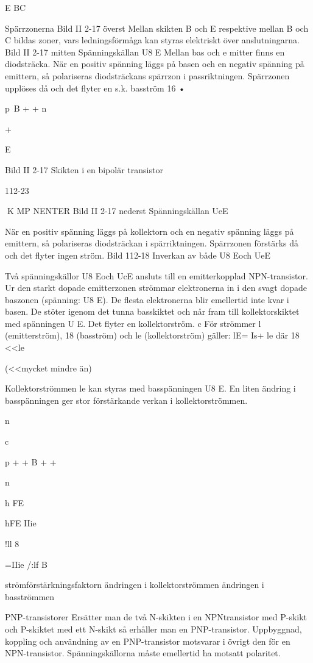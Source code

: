 {E BC

Spärrzonerna
Bild II 2-17 överst
Mellan skikten B och E respektive mellan B
och C bildas zoner, vars ledningsförmåga
kan styras elektriskt över anslutningarna.
Bild II 2-17 mitten
Spänningskällan U8 E
Mellan bas och e mitter finns en diodsträcka.
När en positiv spänning läggs på basen och
en negativ spänning på emittern, så polariseras diodsträckans spärrzon i passriktningen. Spärrzonen upplöses då och det flyter en
s.k. basström 16 •

p~B
+ +
n

+

E

Bild II 2-17 Skikten i en bipolär transistor

112-23

K MP NENTER
Bild II 2-17 nederst
Spänningskällan UeE

När en positiv spänning läggs på kollektorn
och en negativ spänning läggs på emittern,
så polariseras diodsträckan i spärriktningen.
Spärrzonen förstärks då och det flyter ingen
ström.
Bild 112-18
Inverkan av både U8 Eoch UeE

Två spänningskällor U8 Eoch UcE ansluts till
en emitterkopplad NPN-transistor.
Ur den starkt dopade emitterzonen strömmar elektronerna in i den svagt dopade
baszonen (spänning: U8 E). De flesta elektronerna blir emellertid inte kvar i basen. De
stöter igenom det tunna basskiktet och når
fram till kollektorskiktet med spänningen U E.
Det flyter en kollektorström.
c
För strömmer l (emitterström), 18 (basström) och le (kollektorström) gäller:
lE= Is+ le där 18 <<le

(<<mycket mindre än)

Kollektorströmmen le kan styras med basspänningen U8 E.
En liten ändring i basspänningen ger stor
förstärkande verkan i kollektorströmmen.

n

c

p + + B
+ +

n

h
FE

hFE
IIie

!ll 8

=IIie
/:lf
B

strömförstärkningsfaktorn
ändringen i kollektorströmmen
ändringen i basströmmen

PNP-transistorer
Ersätter man de två N-skikten i en NPNtransistor med P-skikt och P-skiktet med ett
N-skikt så erhåller man en PNP-transistor.
Uppbyggnad, koppling och användning
av en PNP-transistor motsvarar i övrigt den
för en NPN-transistor. Spänningskällorna
måste emellertid ha motsatt polaritet.

}
